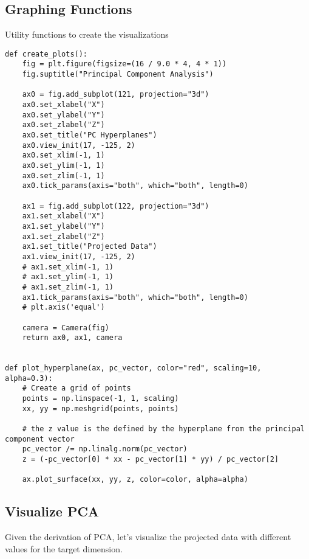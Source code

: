 \documentclass[openany]{book}
\begin{document}
    \subsection{Graphing Functions}\label{graphing-functions}

Utility functions to create the visualizations

\begin{tcolorbox}
\tiny
\begin{verbatim}
def create_plots():
    fig = plt.figure(figsize=(16 / 9.0 * 4, 4 * 1))
    fig.suptitle("Principal Component Analysis")

    ax0 = fig.add_subplot(121, projection="3d")
    ax0.set_xlabel("X")
    ax0.set_ylabel("Y")
    ax0.set_zlabel("Z")
    ax0.set_title("PC Hyperplanes")
    ax0.view_init(17, -125, 2)
    ax0.set_xlim(-1, 1)
    ax0.set_ylim(-1, 1)
    ax0.set_zlim(-1, 1)
    ax0.tick_params(axis="both", which="both", length=0)

    ax1 = fig.add_subplot(122, projection="3d")
    ax1.set_xlabel("X")
    ax1.set_ylabel("Y")
    ax1.set_zlabel("Z")
    ax1.set_title("Projected Data")
    ax1.view_init(17, -125, 2)
    # ax1.set_xlim(-1, 1)
    # ax1.set_ylim(-1, 1)
    # ax1.set_zlim(-1, 1)
    ax1.tick_params(axis="both", which="both", length=0)
    # plt.axis('equal')

    camera = Camera(fig)
    return ax0, ax1, camera


def plot_hyperplane(ax, pc_vector, color="red", scaling=10, alpha=0.3):
    # Create a grid of points
    points = np.linspace(-1, 1, scaling)
    xx, yy = np.meshgrid(points, points)

    # the z value is the defined by the hyperplane from the principal component vector
    pc_vector /= np.linalg.norm(pc_vector)
    z = (-pc_vector[0] * xx - pc_vector[1] * yy) / pc_vector[2]

    ax.plot_surface(xx, yy, z, color=color, alpha=alpha)
\end{verbatim}
\end{tcolorbox}

    \subsection{Visualize PCA}\label{visualize-pca}

Given the derivation of PCA, let's visualize the projected data with
different values for the target dimension.
\end{document}
